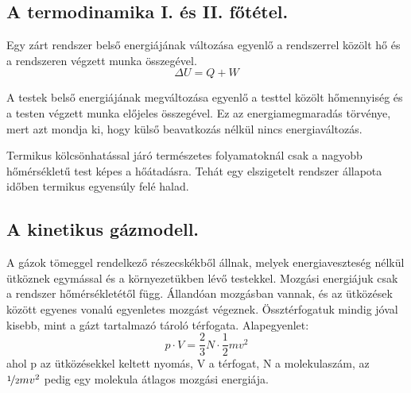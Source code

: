 \subsection{A termodinamika I. és II. főtétel.}
\begin{theorem}[I. főtétel]
	Egy zárt rendszer belső energiájának változása egyenlő a rendszerrel közölt hő és a rendszeren végzett munka összegével.
	$$ \Delta U = Q+W $$
\end{theorem}
A testek belső energiájának megváltozása egyenlő a testtel közölt hőmennyiség és a testen végzett munka előjeles összegével. Ez az energiamegmaradás törvénye, mert azt mondja ki, hogy külső beavatkozás nélkül nincs energiaváltozás.

\begin{theorem}[II. főtétel]
	Termikus kölcsönhatással járó természetes folyamatoknál csak a nagyobb hőmérsékletű test képes a hőátadásra. Tehát egy elszigetelt rendszer állapota időben termikus egyensúly felé halad.
\end{theorem}

\subsection{A kinetikus gázmodell.}
A gázok tömeggel rendelkező részecskékből állnak, melyek energiaveszteség nélkül ütköznek egymással és a környezetükben lévő testekkel. Mozgási energiájuk csak a rendszer hőmérsékletétől függ. Állandóan mozgásban vannak, és az ütközések között egyenes vonalú egyenletes mozgást végeznek. Össztérfogatuk mindig jóval kisebb, mint a gázt tartalmazó tároló térfogata.
Alapegyenlet: $$p \cdot V = \frac{2}{3}N \cdot \frac{1}{2}mv^2$$ ahol p az ütközésekkel keltett nyomás, V a térfogat, N a molekulaszám, az $\nicefrac{1}{2}mv^2$ pedig egy molekula átlagos mozgási energiája.

